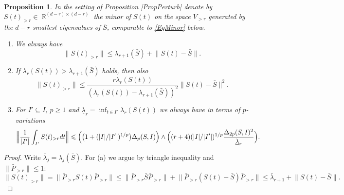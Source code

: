 \documentclass[preprint,aos]{imsart}
\numberwithin{equation}{section}
\newtheorem{proposition}[satz]{Proposition}
\theoremstyle{remark}
\DeclareMathOperator{\R}{{\mathbb R}}
\renewcommand{\subset}{\subseteq}
\providecommand{\abs}[1]{\lvert #1 \rvert}
\providecommand{\norm}[1]{\lVert #1 \rVert}
\providecommand{\bnorm}[1]{{\Bigl\lVert #1 \Bigr\rVert}}
\renewcommand{\le}{\leqslant}
\renewcommand{\ge}{\geqslant}
\begin{document}
\begin{appendix}
\begin{proposition}\label{PropNormPerturb2}
In the setting of Proposition \ref{PropPerturb} denote by $S(t)_{>r}\in\R^{(d-r)\times(d-r)}$ the  minor of $S(t)$ on the space $V_{>r}$ generated by the $d-r$ smallest eigenvalues of $\bar S$, comparable to \eqref{EqMinor} below.
\begin{enumerate}
\item We always have
\[ \norm{S(t)_{>r}}\le \lambda_{r+1}(\bar S)+\norm{S(t)-\bar S}.\]
\item If $\lambda_r(S(t))> \lambda_{r+1}(\bar S)$ holds, then also
\[ \norm{S(t)_{>r}}\le \frac{r\lambda_r(S(t))}{(\lambda_r(S(t))-\lambda_{r+1}(\bar S))^2}\norm{S(t)-\bar S}^2.
\]
\item For $I'\subset I$, $p\ge 1$ and $\underline\lambda_r=\inf_{t\in I'}\lambda_r(S(t))$ we always have in terms of $p$-variations
\[ \bnorm{\frac1{\abs{I'}}\int_{I'}S(t)_{>r}dt}\le \Big(\big(1+(\abs{I}/\abs{I'})^{1/p}\big)\Delta_p(S,I)\Big)\wedge \Big((r+4)(\abs{I}/\abs{I'})^{1/p}\frac{\Delta_{2p}(S,I)^2}{\underline\lambda_r}\Big).
\]
\end{enumerate}
\end{proposition}

\begin{proof}
Write $\bar\lambda_j=\lambda_j(\bar S)$.
For (a) we argue by  triangle inequality and $\norm{\bar P_{>r}}\le 1$:
\[ \norm{S(t)_{>r}}=\norm{\bar P_{>r}S(t)\bar P_{>r}}\le   \norm{\bar P_{>r}\bar S\bar P_{>r}}+ \norm{\bar P_{>r}(S(t)-\bar S)\bar P_{>r}}
\le \bar\lambda_{r+1}+\norm{S(t)-\bar S}.
\]


\end{proof}
\end{appendix}
\end{document}
